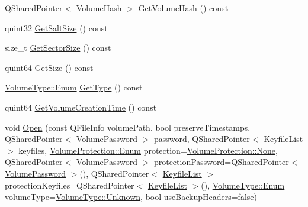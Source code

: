 \begin{DoxyCompactItemize}
\item 
Q\+Shared\+Pointer$<$ \hyperlink{class_gost_crypt_1_1_volume_1_1_volume_hash}{Volume\+Hash} $>$ \hyperlink{class_gost_crypt_1_1_volume_1_1_volume_ab78cd77d6445819e67f360c26cc9faca}{Get\+Volume\+Hash} () const
\item 
quint32 \hyperlink{class_gost_crypt_1_1_volume_1_1_volume_a40ac7e74eb8fc575cff3813638b9ad54}{Get\+Salt\+Size} () const
\item 
size\+\_\+t \hyperlink{class_gost_crypt_1_1_volume_1_1_volume_ab78b80e0baf91e1fe0f367f0064da492}{Get\+Sector\+Size} () const
\item 
quint64 \hyperlink{class_gost_crypt_1_1_volume_1_1_volume_a096bc6810b0667a970b85089cd824cc3}{Get\+Size} () const
\item 
\hyperlink{struct_gost_crypt_1_1_volume_1_1_volume_type_a7fe1979dab76d4534dcb1e26179d4717}{Volume\+Type\+::\+Enum} \hyperlink{class_gost_crypt_1_1_volume_1_1_volume_a39a73e8db2cc25661f3aff719bbb3b4c}{Get\+Type} () const
\item 
quint64 \hyperlink{class_gost_crypt_1_1_volume_1_1_volume_a6e558cb50bff748e3a0f6e099e70a8fe}{Get\+Volume\+Creation\+Time} () const
\item 
void \hyperlink{class_gost_crypt_1_1_volume_1_1_volume_a8e3fb64de87e2a947f6c946abbddeeab}{Open} (const Q\+File\+Info volume\+Path, bool preserve\+Timestamps, Q\+Shared\+Pointer$<$ \hyperlink{class_gost_crypt_1_1_volume_1_1_volume_password}{Volume\+Password} $>$ password, Q\+Shared\+Pointer$<$ \hyperlink{namespace_gost_crypt_1_1_volume_af2dce083ae31a8d22257d609e924963d}{Keyfile\+List} $>$ keyfiles, \hyperlink{struct_gost_crypt_1_1_volume_1_1_volume_protection_a8dd7301af256c893dc1e0a08c7530c7f}{Volume\+Protection\+::\+Enum} protection=\hyperlink{struct_gost_crypt_1_1_volume_1_1_volume_protection_a8dd7301af256c893dc1e0a08c7530c7fad00339f60b8f78724ae6b29f82c9ff2b}{Volume\+Protection\+::\+None}, Q\+Shared\+Pointer$<$ \hyperlink{class_gost_crypt_1_1_volume_1_1_volume_password}{Volume\+Password} $>$ protection\+Password=Q\+Shared\+Pointer$<$ \hyperlink{class_gost_crypt_1_1_volume_1_1_volume_password}{Volume\+Password} $>$(), Q\+Shared\+Pointer$<$ \hyperlink{namespace_gost_crypt_1_1_volume_af2dce083ae31a8d22257d609e924963d}{Keyfile\+List} $>$ protection\+Keyfiles=Q\+Shared\+Pointer$<$ \hyperlink{namespace_gost_crypt_1_1_volume_af2dce083ae31a8d22257d609e924963d}{Keyfile\+List} $>$(), \hyperlink{struct_gost_crypt_1_1_volume_1_1_volume_type_a7fe1979dab76d4534dcb1e26179d4717}{Volume\+Type\+::\+Enum} volume\+Type=\hyperlink{struct_gost_crypt_1_1_volume_1_1_volume_type_a7fe1979dab76d4534dcb1e26179d4717a00b5befddf2b1362a5a66b3a6567ff20}{Volume\+Type\+::\+Unknown}, bool use\+Backup\+Headers=false)

\end{DoxyCompactItemize}

